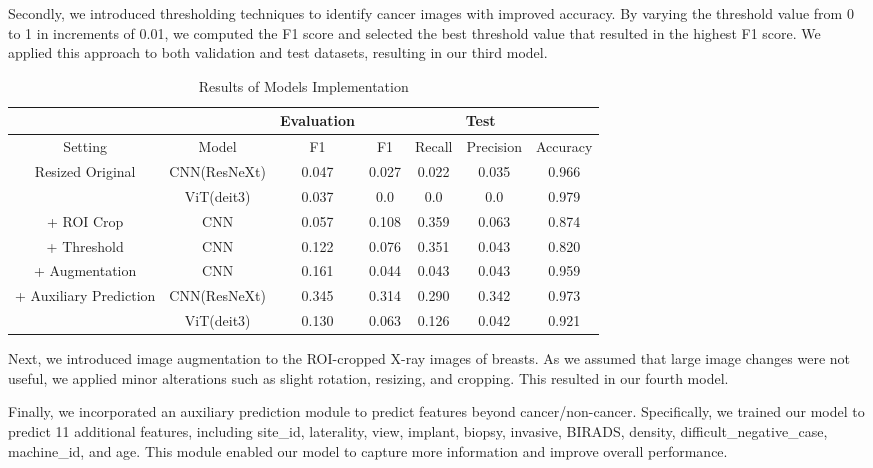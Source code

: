 Secondly, we introduced thresholding techniques to identify cancer images with improved accuracy. By varying the threshold value from 0 to 1 in increments of 0.01, we computed the F1 score and selected the best threshold value that resulted in the highest F1 score. We applied this approach to both validation and test datasets, resulting in our third model. 
\begin{table*}[t]
\centering
\begin{tabular}{|c|c|c|c|c|c|c|}
    \hline
\multicolumn{2}{|c|}{ } & Evaluation &  \multicolumn{4}{c|}{Test} \\
\hline
Setting & Model & F1 & F1 & Recall & Precision & Accuracy \\
\hline\hline
\multirow{2}{*}{Resized Original} & CNN(ResNeXt) & 0.047 & 0.027 & 0.022 & 0.035 & 0.966 \\
& ViT(deit3) & 0.037 & 0.0 & 0.0 & 0.0 & 0.979 \\
\hline
+ ROI Crop & CNN & 0.057 & 0.108 & 0.359 & 0.063 & 0.874\\
\hline
+ Threshold & CNN & 0.122 & 0.076 & 0.351 & 0.043 & 0.820 \\
\hline
+ Augmentation & CNN & 0.161 & 0.044 & 0.043 & 0.043 & 0.959\\
\hline
\multirow{2}{*}{+ Auxiliary Prediction} & CNN(ResNeXt) & 0.345 &  0.314 & 0.290 & 0.342 & 0.973 \\
& ViT(deit3) & 0.130 & 0.063 & 0.126 & 0.042 & 0.921 \\
\hline
\end{tabular}%
\caption{Results of Models Implementation}
\end{table*}
Next, we introduced image augmentation to the ROI-cropped X-ray images of breasts. As we assumed that large image changes were not useful, we applied minor alterations such as slight rotation, resizing, and cropping. This resulted in our fourth model. 

Finally, we incorporated an auxiliary prediction module to predict features beyond cancer/non-cancer. Specifically, we trained our model to predict 11 additional features, including site\_id, laterality, view, implant, biopsy, invasive, BIRADS, density, difficult\_negative\_case, machine\_id, and age. This module enabled our model to capture more information and improve overall performance.
